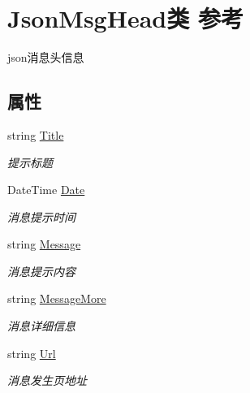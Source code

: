 \hypertarget{class_json_msg_head}{\section{Json\-Msg\-Head类 参考}
\label{class_json_msg_head}
}


json消息头信息  


\subsection*{属性}
\begin{DoxyCompactItemize}
\item 
string \hyperlink{class_json_msg_head_a49bdf4bc535173ee33374933a514e285}{Title}
\begin{DoxyCompactList}\small\item\em 提示标题 \end{DoxyCompactList}\item 
Date\-Time \hyperlink{class_json_msg_head_af78e10272141d88a221ab89bff532637}{Date}
\begin{DoxyCompactList}\small\item\em 消息提示时间 \end{DoxyCompactList}\item 
string \hyperlink{class_json_msg_head_a383ce85bc63ef51d4efb9c6f16324d39}{Message}
\begin{DoxyCompactList}\small\item\em 消息提示内容 \end{DoxyCompactList}\item 
string \hyperlink{class_json_msg_head_a2119772449e6dfa14eb675b3c79a40bb}{Message\-More}
\begin{DoxyCompactList}\small\item\em 消息详细信息 \end{DoxyCompactList}\item 
string \hyperlink{class_json_msg_head_a14b84be17a2783df2316a221318cb9f2}{Url}
\begin{DoxyCompactList}\small\item\em 消息发生页地址 \end{DoxyCompactList}\item 

\end{DoxyCompactItemize}
